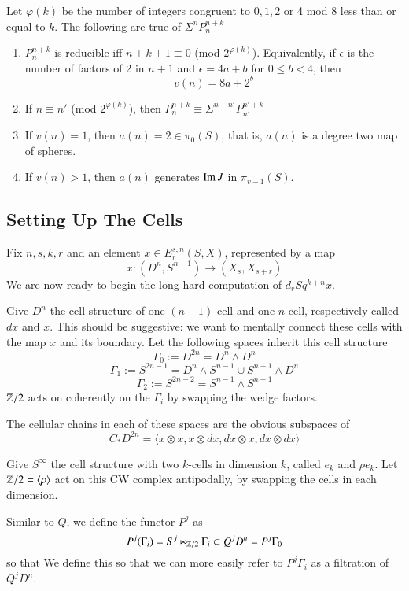 \begin{Theorem}
  \label{sec:stuntthm}
  Let $\varphi(k)$ be the number of integers congruent to $0,1,2$ or 4 mod 8 less than or equal to $k$.  
  The following are true of $\Sigma^n P^{n+k}_n$
  \begin{enumerate}
  \item $P^{n+k}_n$ is reducible iff $n+k+1\equiv 0$ (mod $2^{\varphi(k)}$).
    Equivalently, if $\epsilon$ is the number of factors of 2 in $n+1$ and $\epsilon = 4a+b$ for $0\le b < 4$, then
    \[v(n)=8a+2^b\]
  \item If $n\equiv n'$ (mod $2^{\varphi(k)}$), then $P^{n+k}_n\equiv \Sigma^{n-n'}P^{n'+k}_{n'}$
  \item If $v(n)=1$, then $a(n)=2\in \pi_0(S)$, that is, $a(n)$ is a degree two map of spheres.  
  \item If $v(n)>1$, then $a(n)$ generates $\operatorname{Im}\nolimits J$ in $\pi_{v-1}(S)$.  
  \end{enumerate}
\end{Theorem}

\subsection{Setting Up The Cells}
\label{sec:setup}

Fix $n,s,k,r$ and an element $x\in E_r^{s,n}(S,X)$, represented by a map
\[x: (D^n,S^{n-1})\to (X_s,X_{s+r})\]
We are now ready to begin the long hard computation of $d_rSq^{k+n}x$.  

Give $D^n$ the cell structure of one $(n-1)$-cell and one $n$-cell, respectively called $dx$ and $x$.
This should be suggestive: we want to mentally connect these cells with the map $x$ and its boundary.  
Let the following spaces inherit this cell structure
\[\Gamma_0:=D^{2n}=D^n\wedge D^n\]
\[\Gamma_1:=S^{2n-1}=D^n\wedge S^{n-1}\cup S^{n-1}\wedge D^n\]
\[\Gamma_2:=S^{2n-2}=S^{n-1}\wedge S^{n-1}\]
$\mathbb{Z}/2$ acts on coherently on the $\Gamma_i$ by swapping the wedge factors.  

The cellular chains in each of these spaces are the obvious subspaces of
\[C_*D^{2n} = \langle x\otimes x,x\otimes dx,dx\otimes x,dx\otimes dx\rangle\]

Give $S^\infty$ the cell structure with two $k$-cells in dimension $k$, called $e_k$ and $\rho e_k$.
Let $\mathbb{Z}/2=\langle \rho \rangle$ act on this CW complex antipodally, by swapping the cells in each dimension.  

Similar to $Q$, we define the functor $P^j$ as
\[P^j(\Gamma_i)=S^j\ltimes_{\mathbb{Z}/2}\Gamma_i\subset Q^jD^n=P^j\Gamma_0\]
so that
We define this so that we can more easily refer to $P^j\Gamma_i$ as a filtration of $Q^jD^n$.  


